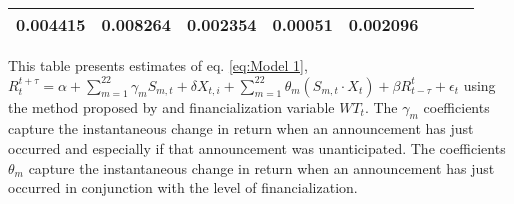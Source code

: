 \begin{sidewaystable}
{\begin{tabular}{@{}lllllllllllll@{}}
\multicolumn{2}{c}{ 0.004415 }                                                 & \multicolumn{2}{c}{ 0.008264 }                                                 & \multicolumn{2}{c}{ 0.002354 }                                                 & \multicolumn{2}{c}{ 0.00051 }                                                   & \multicolumn{2}{c}{ 0.002096 }                                                 \\ \bottomrule 
\end{tabular}
}
\begin{tablenotes}\item 
    \singlespacing
    \footnotesize
    This table presents estimates of eq. \ref{eq:Model 1}, $R_{t}^{t+\tau}=\alpha+\sum_{m=1}^{22} \gamma_m S_{m,t}+ \delta X_{t,i} + \sum_{m=1}^{22} \theta_m (S_{m,t} \cdot X_t)+\beta R_{t-\tau}^{t}+\epsilon_{t}$ using the method proposed by \citet{kurov2019price} and financialization variable $WT_t$. The $\gamma_m$ coefficients capture the instantaneous change in return when an announcement has just occurred and especially if that announcement was unanticipated. The coefficients $\theta_m$ capture the instantaneous change in return when an announcement has just occurred in conjunction with the level of financialization.
\end{tablenotes}
\end{sidewaystable}

